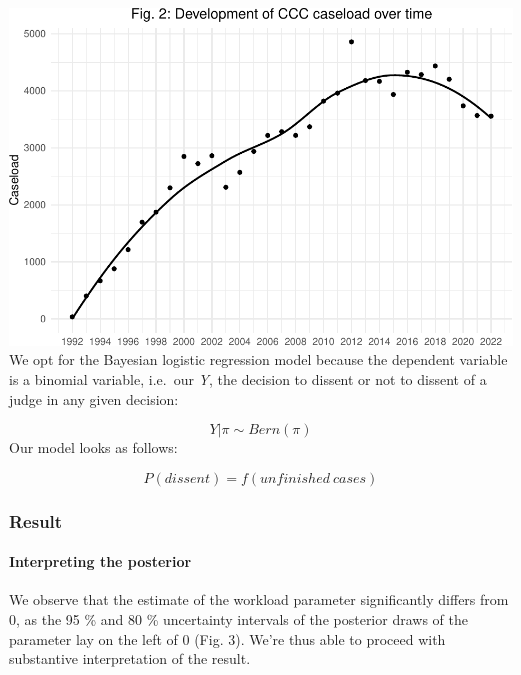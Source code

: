 \documentclass[
  11pt,
]{article}
\begin{document}
\vspace{25pt}

\includegraphics{dissents_article_anonymised_files/figure-latex/caseload_over_time-1.pdf}
\vspace{25pt} We opt for the Bayesian logistic regression model because
the dependent variable is a binomial variable, i.e.~our \emph{Y}, the
decision to dissent or not to dissent of a judge in any given decision:

\[
Y | \pi \sim Bern(\pi)
\] Our model looks as follows:

\[
P(dissent) = f(unfinished\:cases)
\]

\hypertarget{result}{%
\subsubsection{Result}\label{result}}

\hypertarget{interpreting-the-posterior}{%
\paragraph{Interpreting the
posterior}\label{interpreting-the-posterior}}

We observe that the estimate of the workload parameter significantly
differs from 0, as the 95 \% and 80 \% uncertainty intervals of the
posterior draws of the parameter lay on the left of 0 (Fig. 3). We're
thus able to proceed with substantive interpretation of the result.

\vspace{25pt}
\end{document}
